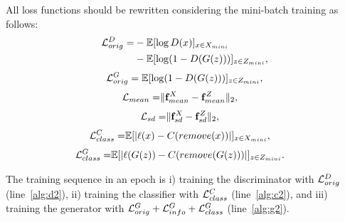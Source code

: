 All loss functions should be rewritten considering the mini-batch training as follows:
\begin{equation}\begin{aligned}
\mathcal{L}_{orig}^{D} = & -\mathbb{E}[\log D(x)]_{x \in X_{mini}} \\
  & - \mathbb{E}[\log (1-D(G(z)))]_{z \in Z_{mini}},
\end{aligned}\end{equation}
\begin{equation}\begin{aligned}
\mathcal{L}_{orig}^{G} = \mathbb{E}[\log (1-D(G(z)))]_{z \in Z_{mini}},
\end{aligned}\end{equation}
\begin{equation}\begin{aligned}
\mathcal{L}_{mean} =  & \| \mathbf{f}_{mean}^X - \mathbf{f}_{mean}^Z\|_2,
\end{aligned}\end{equation}
\begin{equation}\begin{aligned}
\mathcal{L}_{sd} =  & \| \mathbf{f}_{sd}^X - \mathbf{f}_{sd}^Z\|_2,
\end{aligned}\end{equation}
\begin{equation}\begin{aligned}
\mathcal{L}_{class}^{C} =  & \mathbb{E}[|\ell(x)-C(remove(x))|]_{x \in X_{mini}},
\end{aligned}\end{equation}
\begin{equation}\begin{aligned}
\mathcal{L}_{class}^{G} = &\mathbb{E}[|\ell(G(z))-C(remove(G(z)))
|]_{z \in Z_{mini}}.
\end{aligned}\end{equation}

The training sequence in an epoch is i) training the discriminator with $\mathcal{L}_{orig}^{D}$ (line~\ref{alg:d2}), ii) training the classifier with $\mathcal{L}_{class}^{C}$ (line~\ref{alg:c2}), and iii) training the generator with $\mathcal{L}_{orig}^{G} + \mathcal{L}_{info}^{G} + \mathcal{L}_{class}^{G}$ (line~\ref{alg:g2}).

